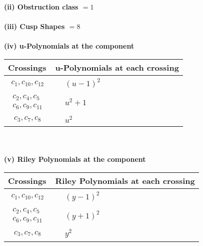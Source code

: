 \documentclass[1p]{elsarticle_modified}
\theoremstyle{definition}
\begin{document}
\flushleft \textbf{(ii) Obstruction class $= 1$}\\~\\
\flushleft \textbf{(iii) Cusp Shapes $= 8$}\\~\\
\newpage\renewcommand{\arraystretch}{1}
\flushleft \textbf{(iv) u-Polynomials at the component}\newline \\
\begin{tabular}{m{50pt}|m{274pt}}
Crossings & \hspace{64pt}u-Polynomials at each crossing \\
\hline $$\begin{aligned}c_{1},c_{10},c_{12}\end{aligned}$$&$\begin{aligned}
&(u-1)^2
\end{aligned}$\\
\hline $$\begin{aligned}c_{2},c_{4},c_{5}\\c_{6},c_{9},c_{11}\end{aligned}$$&$\begin{aligned}
&u^2+1
\end{aligned}$\\
\hline $$\begin{aligned}c_{3},c_{7},c_{8}\end{aligned}$$&$\begin{aligned}
&u^2
\end{aligned}$\\
\hline
\end{tabular}\\~\\
\newpage\renewcommand{\arraystretch}{1}
\flushleft \textbf{(v) Riley Polynomials at the component}\newline \\
\begin{tabular}{m{50pt}|m{274pt}}
Crossings & \hspace{64pt}Riley Polynomials at each crossing \\
\hline $$\begin{aligned}c_{1},c_{10},c_{12}\end{aligned}$$&$\begin{aligned}
&(y-1)^2
\end{aligned}$\\
\hline $$\begin{aligned}c_{2},c_{4},c_{5}\\c_{6},c_{9},c_{11}\end{aligned}$$&$\begin{aligned}
&(y+1)^2
\end{aligned}$\\
\hline $$\begin{aligned}c_{3},c_{7},c_{8}\end{aligned}$$&$\begin{aligned}
&y^2
\end{aligned}$\\
\hline
\end{tabular}\\~\\
\end{document}
